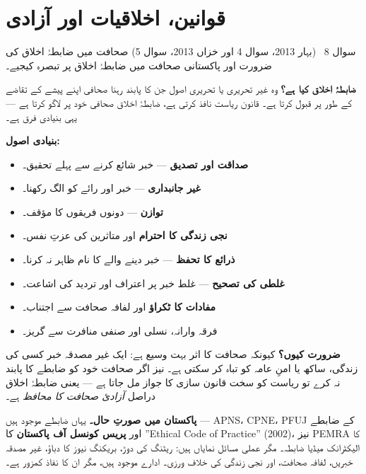 \section*{قوانین، اخلاقیات اور آزادی}

\begin{sawal}{سوال \textenglish{8} \ \textnormal{\small(بہار \textenglish{2013}، سوال \textenglish{4} اور خزاں \textenglish{2013}، سوال \textenglish{5})}}
صحافت میں ضابطۂ اخلاق کی ضرورت اور پاکستانی صحافت میں ضابطۂ اخلاق پر تبصرہ
کیجیے۔
\end{sawal}

\begin{hal}
\textbf{ضابطۂ اخلاق کیا ہے؟} وہ غیر تحریری یا تحریری اصول جن کا پابند رہنا
صحافی اپنے پیشے کے تقاضے کے طور پر قبول کرتا ہے۔ قانون ریاست نافذ کرتی ہے،
ضابطۂ اخلاق صحافی خود پر لاگو کرتا ہے --- یہی بنیادی فرق ہے۔

\medskip
\textbf{بنیادی اصول:}
\begin{itemize}\setlength{\itemsep}{1pt}
  \item \textbf{صداقت اور تصدیق} --- خبر شائع کرنے سے پہلے تحقیق۔
  \item \textbf{غیر جانبداری} --- خبر اور رائے کو الگ رکھنا۔
  \item \textbf{توازن} --- دونوں فریقوں کا مؤقف۔
  \item \textbf{نجی زندگی کا احترام} اور متاثرین کی عزتِ نفس۔
  \item \textbf{ذرائع کا تحفظ} --- خبر دینے والے کا نام ظاہر نہ کرنا۔
  \item \textbf{غلطی کی تصحیح} --- غلط خبر پر اعتراف اور تردید کی اشاعت۔
  \item \textbf{مفادات کا ٹکراؤ} اور لفافہ صحافت سے اجتناب۔
  \item فرقہ وارانہ، نسلی اور صنفی منافرت سے گریز۔
\end{itemize}

\textbf{ضرورت کیوں؟} کیونکہ صحافت کا اثر بہت وسیع ہے: ایک غیر مصدقہ خبر کسی
کی زندگی، ساکھ یا امنِ عامہ کو تباہ کر سکتی ہے۔ نیز اگر صحافت خود کو ضابطے کا
پابند نہ کرے تو ریاست کو سخت قانون سازی کا جواز مل جاتا ہے --- یعنی ضابطۂ
اخلاق دراصل \emph{آزادیٔ صحافت کا محافظ} ہے۔

\medskip
\textbf{پاکستان میں صورتِ حال۔} یہاں ضابطے موجود ہیں ---
\textenglish{APNS}، \textenglish{CPNE}، \textenglish{PFUJ} کے ضابطے اور
\textbf{پریس کونسل آف پاکستان} کا ''\textenglish{Ethical Code of Practice}''
(\textenglish{2002})، نیز \textenglish{PEMRA} کا الیکٹرانک میڈیا ضابطہ۔ مگر
عملی مسائل نمایاں ہیں: ریٹنگ کی دوڑ، بریکنگ نیوز کا دباؤ، غیر مصدقہ خبریں،
لفافہ صحافت، اور نجی زندگی کی خلاف ورزی۔ ادارے موجود ہیں، مگر ان کا نفاذ کمزور
ہے۔

\end{hal}

